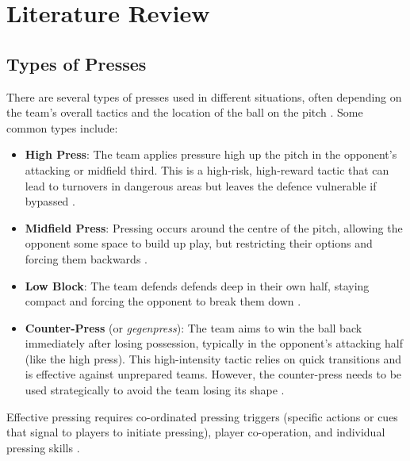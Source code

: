 \documentclass[12pt]{article}
\begin{document}
\section{Literature Review}

\subsection{Types of Presses}
There are several types of presses used in different situations, often depending on the team's overall tactics and the location of the ball on the pitch \citep{chambers_toby_different_2022}. Some common types include:
\begin{itemize}
    \item \textbf{High Press}: The team applies pressure high up the pitch in the opponent's attacking or midfield third. This is a high-risk, high-reward tactic that can lead to turnovers in dangerous areas but leaves the defence vulnerable if bypassed \citep{chambers_toby_different_2022, low_exploring_2018}.
    \item \textbf{Midfield Press}: Pressing occurs around the centre of the pitch, allowing the opponent some space to build up play, but restricting their options and forcing them backwards \citep{chambers_toby_different_2022}.
    \item \textbf{Low Block}: The team defends defends deep in their own half, staying compact and forcing the opponent to break them down \citep{chambers_toby_different_2022, low_exploring_2018}.
    \item \textbf{Counter-Press} (or \textit{gegenpress}): The team aims to win the ball back immediately after losing possession, typically in the opponent's attacking half (like the high press). This high-intensity tactic relies on quick transitions and is effective against unprepared teams. However, the counter-press needs to be used strategically to avoid the team losing its shape \citep{chambers_toby_different_2022}.
\end{itemize}

Effective pressing requires co-ordinated pressing triggers (specific actions or cues that signal to players to initiate pressing), player co-operation, and individual pressing skills \citep{modric_influence_2023}.
\end{document}
